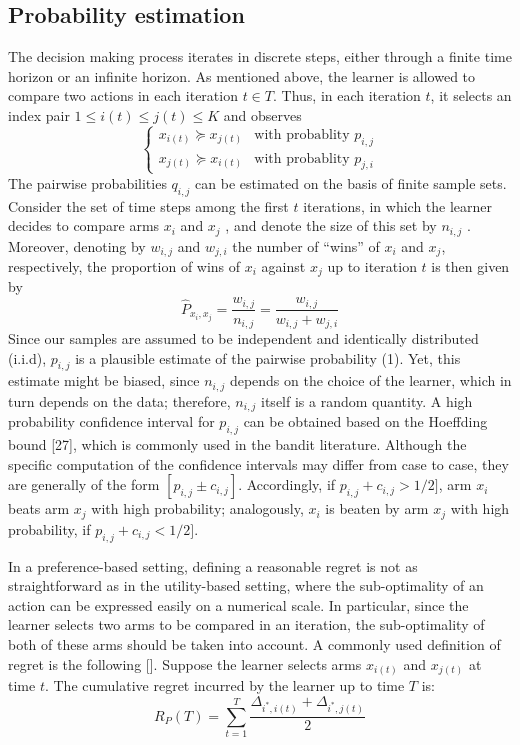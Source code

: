 \documentclass{llncs}
\begin{document}
	\subsection{Probability estimation}		 
		 The decision making process iterates in discrete steps, either through a finite time horizon or an infinite horizon. 
		 As mentioned above, the learner is allowed to compare two actions in each iteration $t \in T$. 
		 Thus, in each iteration $t$, it selects an index pair $1 \leq i(t) \leq j(t) \leq K$ and observes
	\begin{equation}
		\begin{cases}
    		x_{i(t)} \succeq x_{j(t)} & \text{with probablity } p_{i,j} 
       	\\
    		x_{j(t)} \succeq x_{i(t)} & \text{with probablity } p_{j,i}
	\end{cases}
	\end{equation}		
	The pairwise probabilities $q_{i,j}$ can be estimated on the basis of finite sample sets. 
	Consider the set of time steps among the first $t$ iterations, in which the learner decides to compare arms $x_i$ and $x_j$ , and denote the size of this set by $n_{i,j}$ . 
	Moreover, denoting by $w_{i,j}$ and $w_{j,i}$ the number of “wins” of $x_i$ and $x_j$, respectively, the proportion of wins of $x_i$ against $x_j$ up to iteration $t$ is then given by
	$$ 
		\hat{P}_{x_i, x_j} = \frac{w_{i,j}}{n_{i,j}} = 
		\frac{w_{i,j}}{w_{i,j}+w_{j,i}}
	$$
	Since our samples are assumed to be independent and identically distributed (i.i.d), $p_{i,j}$ is a plausible estimate of the pairwise probability (1). 
	Yet, this estimate might be biased, since $n_{i,j}$ depends on the choice of the learner, which in turn depends on the data; therefore, $n_{i,j}$ itself is a random quantity. 
	A high probability confidence interval for $p_{i,j}$ can be obtained based on the Hoeffding bound [27], which is commonly used in the bandit literature. 
	Although the specific computation of the confidence intervals may differ from case to case, they are generally of the form $[p_{i,j} \pm c_{i,j} ]$. 
	Accordingly, if $p_{i,j} + c_{i,j} > 1/2]$, arm $x_{i}$ beats arm $x_{j}$ with high probability; analogously, $x_{i}$ is beaten by arm $x_{j}$ with high probability, if $p_{i,j} + c_{i,j} < 1/2]$.
	
	In a preference-based setting, defining a reasonable regret is not as straightforward as in the utility-based setting, where the sub-optimality of an action can be expressed easily on a numerical scale. 
	In particular, since the learner selects two arms to be compared in an iteration, the sub-optimality of both of these arms should be taken into account.
	A commonly used definition of regret is the following []. Suppose the learner selects arms $x_{i(t)}$ and $x_{j(t)}$ at time $t$. The cumulative regret incurred by the learner up to time $T$ is:
	\begin{equation}
	R_P(T) = \sum_{t=1}^T \frac{\Delta_{i^*,i(t)}+\Delta_{i^*,j(t)}}{2} 
	\end{equation}	 
	
\end{document}

